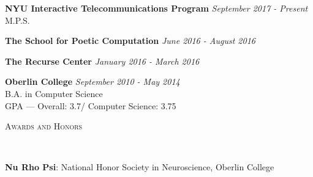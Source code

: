 \documentclass[9pt]{article}
\newenvironment{changemargin}[2]{%
  \begin{list}{}{%
    \setlength{\topsep}{0pt}%
    \setlength{\leftmargin}{#1}%
    \setlength{\rightmargin}{#2}%
    \setlength{\listparindent}{\parindent}%
    \setlength{\itemindent}{\parindent}%
    \setlength{\parsep}{\parskip}%
  }%
  \item[]}{\end{list}
}
\newcommand{\lineover}{
	\begin{changemargin}{-0.05in}{-0.05in}
		\vspace*{-8pt}
		\hrulefill \\
		\vspace*{-2pt}
	\end{changemargin}
}
\newcommand{\header}[1]{
	\begin{changemargin}{-0.5in}{-0.5in}
		\scshape{#1}\\
  	\lineover
	\end{changemargin}
}
\newenvironment{body} {
	\vspace*{-16pt}
	\begin{changemargin}{-0.25in}{-0.5in}
  }
	{\end{changemargin}
}
\begin{document}
\begin{body}
	\vspace{14pt}
	\textbf{NYU Interactive Telecommunications Program}{} \hfill \emph{September 2017 - Present}{} \\
	M.P.S.
	\smallskip

	\textbf{The School for Poetic Computation}{} \hfill \emph{June 2016 - August 2016}{} \\
	\smallskip

	\textbf{The Recurse Center}{} \hfill \emph{January 2016 - March 2016}{} \\
	\smallskip

	\textbf{Oberlin College}{} \hfill \emph{September 2010 - May 2014}{} \\
	B.A. in Computer Science \\
	GPA --- Overall: 3.7/ Computer Science: 3.75 \\
\end{body}

\smallskip

\header{Awards and Honors}

\begin{body}
	\vspace{14pt}
	\textbf{Nu Rho Psi}: National Honor Society in Neuroscience, Oberlin College \\
	\smallskip
\end{body}
\end{document}
